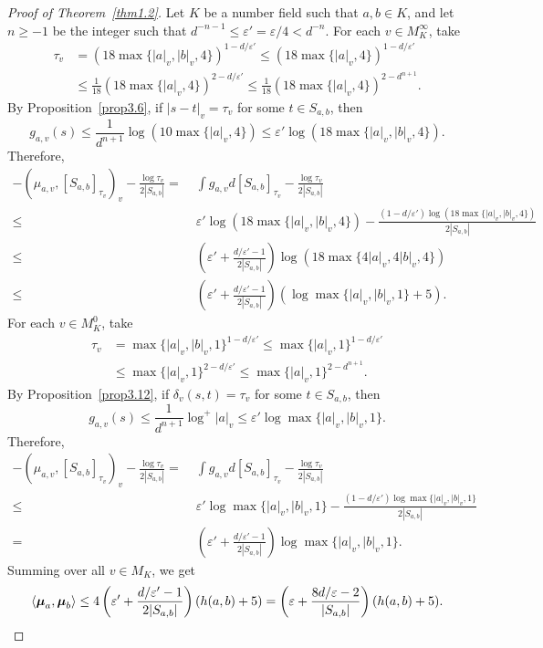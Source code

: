 \documentclass[10pt,a4paper]{amsart}
\numberwithin{equation}{section}
\theoremstyle{plain}
\theoremstyle{definition}
\theoremstyle{remark}
\begin{document}
\begin{proof}[Proof of Theorem~\ref{thm1.2}]
Let $K$ be a number field such
that $a,b\in K$, and let $n\geq-1$ be the integer such that $d^{-n-1}\leq\varepsilon'=\varepsilon/4<d^{-n}$.
For each $v\in M_{K}^{\infty}$, take
\begin{align*}
\tau_{v} & =(18\max\{|a|_{v},|b|_{v},4\})^{1-d/\varepsilon'}\leq(18\max\{|a|_{v},4\})^{1-d/\varepsilon'}\\
 & \leq\frac{1}{18}(18\max\{|a|_{v},4\})^{2-d/\varepsilon'}\leq\frac{1}{18}(18\max\{|a|_{v},4\})^{2-d^{n+1}}.
\end{align*}
By Proposition~\ref{prop3.6}, if $|s-t|_{v}=\tau_{v}$ for some $t\in S_{a,b}$,
then
\[
g_{a,v}(s)\leq\frac{1}{d^{n+1}}\log(10\max\{|a|_{v},4\})\leq\varepsilon'\log(18\max\{|a|_{v},|b|_{v},4\}).
\]
Therefore,
\begin{align*}
 -\left(\mu_{a,v},[S_{a,b}]_{\tau_{v}}\right)_{v}-\frac{\log\tau_{v}}{2|S_{a,b}|}=\;&\int g_{a,v}d[S_{a,b}]_{\tau_{v}}-\frac{\log\tau_{v}}{2|S_{a,b}|}\\
\leq\; & \varepsilon'\log(18\max\{|a|_{v},|b|_{v},4\})-\frac{(1-d/\varepsilon')\log(18\max\{|a|_{v},|b|_{v},4\})}{2|S_{a,b}|}\\
\leq\; & \left(\varepsilon'+\frac{d/\varepsilon'-1}{2|S_{a,b}|}\right)\log(18\max\{4|a|_{v},4|b|_{v},4\})\\
\leq\; & \left(\varepsilon'+\frac{d/\varepsilon'-1}{2|S_{a,b}|}\right)(\log\max\{|a|_{v},|b|_{v},1\}+5).
\end{align*}
For each $v\in M_{K}^{0}$, take
\begin{align*}
\tau_{v} & =\max\{|a|_{v},|b|_{v},1\}^{1-d/\varepsilon'}\leq\max\{|a|_{v},1\}^{1-d/\varepsilon'}\\
 & \leq\max\{|a|_{v},1\}^{2-d/\varepsilon'}\leq\max\{|a|_{v},1\}^{2-d^{n+1}}.
\end{align*}
By Proposition~\ref{prop3.12}, if $\delta_{v}(s,t)=\tau_{v}$ for
some $t\in S_{a,b}$, then
\[
g_{a,v}(s)\leq\frac{1}{d^{n+1}}\log^{+}|a|_{v}\leq\varepsilon'\log\max\{|a|_{v},|b|_{v},1\}.
\]
Therefore,
\begin{align*}
  -\left(\mu_{a,v},[S_{a,b}]_{\tau_{v}}\right)_{v}-\frac{\log\tau_{v}}{2|S_{a,b}|}=\;&\int g_{a,v}d[S_{a,b}]_{\tau_{v}}-\frac{\log\tau_{v}}{2|S_{a,b}|}\\
\leq\; & \varepsilon'\log\max\{|a|_{v},|b|_{v},1\}-\frac{(1-d/\varepsilon')\log\max\{|a|_{v},|b|_{v},1\}}{2|S_{a,b}|}\\
=\; & \left(\varepsilon'+\frac{d/\varepsilon'-1}{2|S_{a,b}|}\right)\log\max\{|a|_{v},|b|_{v},1\}.
\end{align*}
Summing over all $v\in M_{K}$, we get
\[
\left\langle \boldsymbol{\mu}_{a},\boldsymbol{\mu}_{b}\right\rangle \leq4\left(\varepsilon'+\frac{d/\varepsilon'-1}{2|S_{a,b}|}\right)(h(a,b)+5)=\left(\varepsilon+\frac{8d/\varepsilon-2}{|S_{a,b}|}\right)(h(a,b)+5).\qedhere
\]
\end{proof}
\end{document}
